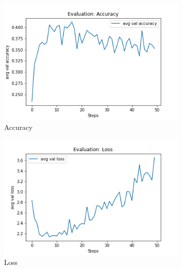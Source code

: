 \begin{figure}[H]
     \centering
     \begin{subfigure}[b]{0.3\textwidth}
         \centering
         \includegraphics[width=\textwidth]{./figure/results/look_around/eval/avg val accuracy.png}
         \caption{Accuracy}
         \label{fig:la_e_accuracy}
     \end{subfigure}
     \hfill
     \begin{subfigure}[b]{0.3\textwidth}
         \centering
         \includegraphics[width=\textwidth]{./figure/results/look_around/eval/avg val loss.png}
         \caption{Loss}
         \label{fig:la_e_loss}
     \end{subfigure}
     \hfill
     \begin{subfigure}[b]{0.3\textwidth}
         \centering

\end{subfigure}
\end{figure}

